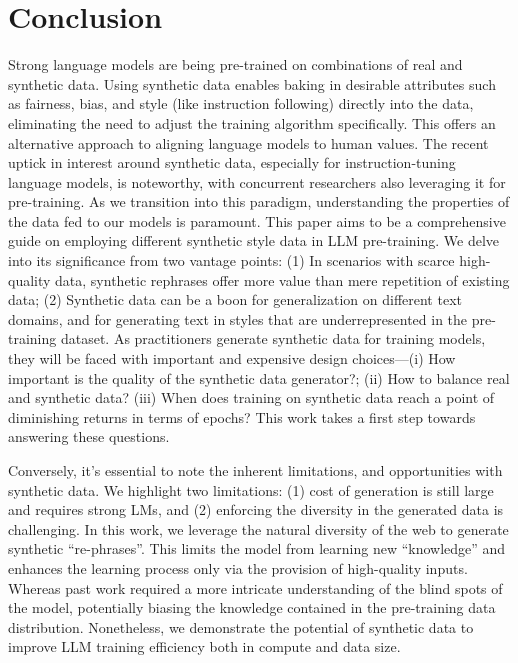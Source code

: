 \section{Conclusion}
Strong language models are being pre-trained on combinations of real and synthetic data. 
Using synthetic data enables baking in desirable attributes such as fairness, bias, and style (like instruction following) directly into the data, eliminating the need to adjust the training algorithm specifically. This offers an alternative approach to aligning language models to human values. 
The recent uptick in interest around synthetic data, especially for instruction-tuning language models, is noteworthy, with concurrent researchers also leveraging it for pre-training. 
As we transition into this paradigm, understanding the properties of the data fed to our models is paramount. 
This paper aims to be a comprehensive guide on employing different synthetic style data in LLM pre-training. We delve into its significance from two vantage points: (1) In scenarios with scarce high-quality data, synthetic rephrases offer more value than mere repetition of existing data; (2) Synthetic data can be a boon for generalization on different text domains, and for generating text in styles that are underrepresented in the pre-training dataset. 
As practitioners generate synthetic data for training models, they will be faced with important and expensive design choices---(i) How important is the quality of the synthetic data generator?; (ii) How to balance real and synthetic data? (iii) When does training on synthetic data reach a point of diminishing returns in terms of epochs? This work takes a first step towards answering these questions.

Conversely, it's essential to note the inherent limitations, and opportunities with synthetic data. We highlight two limitations: (1) cost of generation is still large and requires strong LMs, and (2) enforcing the diversity in the generated data is challenging.  In this work, we leverage the natural diversity of the web to generate synthetic ``re-phrases''. This limits the model from learning new ``knowledge'' and enhances the learning process only via the provision of high-quality inputs. Whereas past work required a more intricate understanding of the blind spots of the model, potentially biasing the knowledge contained in the pre-training data distribution. Nonetheless, we demonstrate the potential of synthetic data to improve LLM training efficiency both in compute and data size. 




